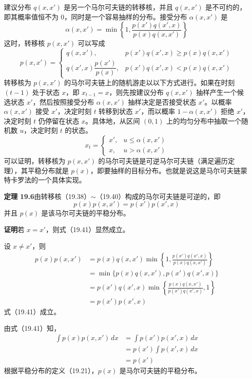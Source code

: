 \documentclass[UTF8, 12pt, fontset=fandol, oneside]{ctexart}
\begin{document}
建议分布 $q(x,x')$ 是另一个马尔可夫链的转移核，并且 $q(x,x')$ 是不可约的，即其概率值恒不为 0，同时是一个容易抽样的分布。接受分布 $\alpha(x,x')$ 是
\begin{equation}
\alpha(x,x')=\min\left\{1,\frac{p(x')q(x',x)}{p(x)q(x,x')}\right\}
\tag{19.39}
\end{equation}
这时，转移核 $p(x,x')$ 可以写成
\begin{equation}
p(x,x')=
\begin{cases}
q(x,x'), & p(x')q(x',x)\geqslant p(x)q(x,x')\\
q(x',x)\dfrac{p(x')}{p(x)}, & p(x')q(x',x)<p(x)q(x,x')
\end{cases}
\tag{19.40}
\end{equation}
转移核为 $p(x,x')$ 的马尔可夫链上的随机游走以以下方式进行。如果在时刻
$(t-1)$ 处于状态 $x$，即 $x_{t-1}=x$，则先按建议分布 $q(x,x')$ 抽样产生一个候选状态 $x'$，然后按照接受分布 $\alpha(x,x')$ 抽样决定是否接受状态 $x'$。以概率 $\alpha(x,x')$ 接受 $x'$，决定时刻 $t$ 转移到状态 $x'$，而以概率 $1-\alpha(x,x')$ 拒绝 $x'$，决定时刻 $t$ 仍停留在状态 $x$。具体地，从区间 $(0,1)$ 上的均匀分布中抽取一个随机数 $u$，决定时刻 $t$ 的状态。
\[
x_t=
\begin{cases}
x', & u\leqslant \alpha(x,x')\\
x, & u>\alpha(x,x')
\end{cases}
\]
可以证明，转移核为 $p(x,x')$ 的马尔可夫链是可逆马尔可夫链（满足遍历定理），其平稳分布就是 $p(x)$，即要抽样的目标分布。也就是说这是马尔可夫链蒙特卡罗法的一个具体实现。

\noindent\textbf{定理 19.6}\quad 由转移核（19.38）$\sim$（19.40）构成的马尔可夫链是可逆的，即
\begin{equation}
p(x)p(x,x')=p(x')p(x',x)
\tag{19.41}
\end{equation}
并且 $p(x)$ 是该马尔可夫链的平稳分布。

\noindent\textbf{证明}\quad 若 $x=x'$，则式（19.41）显然成立。

设 $x\neq x'$，则
\[
\begin{aligned}
p(x)p(x,x')
&=p(x)q(x,x')\min\left\{1,\frac{p(x')q(x',x)}{p(x)q(x,x')}\right\}\\
&=\min\{p(x)q(x,x'),p(x')q(x',x)\}\\
&=p(x')q(x',x)\min\left\{\frac{p(x)q(x,x')}{p(x')q(x',x)},1\right\}\\
&=p(x')p(x',x)
\end{aligned}
\]
式（19.41）成立。

由式（19.41）知，
\[
\begin{aligned}
\int p(x)p(x,x')\,dx
&=\int p(x')p(x',x)\,dx\\
&=p(x')\int p(x',x)\,dx\\
&=p(x')
\end{aligned}
\]
根据平稳分布的定义（19.21），$p(x)$ 是马尔可夫链的平稳分布。
\end{document}
